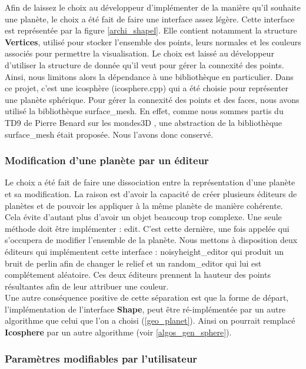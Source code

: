 \documentclass[a4paper]{article}
\begin{document}
Afin de laissez le choix au développeur d'implémenter de la manière qu'il souhaite une planète, le choix a été fait de faire une interface assez légère. Cette interface est représentée par la figure \ref{archi_shapel}. Elle contient notamment la structure \textbf{Vertices}, utilisé pour stocker l'ensemble des points, leurs normales et les couleurs associés pour permettre la visualisation. Le choix est laissé au développeur d'utiliser la structure de donnée qu'il veut pour gérer la connexité des points. Ainsi, nous limitons alors la dépendance à une bibliothèque en particulier. 
Dans ce projet, c'est une icosphère (icosphere.cpp) qui a été choisie pour représenter une planète sphérique. Pour gérer la connexité des points et des faces, nous avons utilisé la bibliothèque surface\_mesh. En effet, comme nous sommes partis du TD9 de Pierre Benard sur les mondes3D \cite{TD_3D}, une abstraction de la bibliothèque surface\_mesh était proposée. Nous l'avons donc conservé.\\

\subsubsection{Modification d'une planète par un éditeur}

Le choix a été fait de faire une dissociation entre la représentation d'une planète et sa modification. La raison est d'avoir la capacité de créer plusieurs éditeurs de planètes et de pouvoir les appliquer à la même planète de manière cohérente. Cela évite d'autant plus d'avoir un objet beaucoup trop complexe. Une seule méthode doit être implémenter : edit. C'est cette dernière, une fois appelée qui s'occupera de modifier l'ensemble de la planète. Nous mettons à disposition deux éditeurs qui implémentent cette interface : noisyheight\_editor qui produit un bruit de perlin afin de changer le relief et un random\_editor qui lui est complétement aléatoire. Ces deux éditeurs prennent la hauteur des points résultantes afin de leur attribuer une couleur.\\
Une autre conséquence positive de cette séparation est que la forme de départ, l'implémentation de l'interface \textbf{Shape}, peut être ré-implémentée par un autre algorithme que celui que l'on a choisi (\ref{geo_planet}). Ainsi on pourrait remplacé \textbf{Icosphere} par un autre algorithme (voir \ref{algos_gen_sphere}).\\

\subsubsection{Paramètres modifiables par l'utilisateur}
\end{document}
